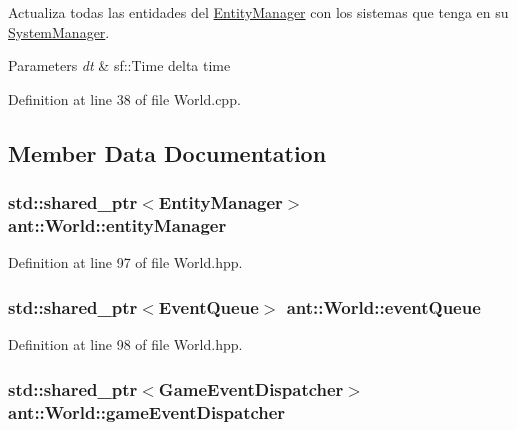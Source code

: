 Actualiza todas las entidades del \hyperlink{classant_1_1_entity_manager}{Entity\+Manager} con los sistemas que tenga en su \hyperlink{classant_1_1_system_manager}{System\+Manager}. 


\begin{DoxyParams}{Parameters}
{\em dt} & sf\+::\+Time delta time \\
\hline
\end{DoxyParams}


Definition at line 38 of file World.\+cpp.



\subsection{Member Data Documentation}
\hypertarget{classant_1_1_world_adc67b8557d684ffb1e029854d795e69d}{
\subsubsection[{entity\+Manager}]{\setlength{\rightskip}{0pt plus 5cm}std\+::shared\+\_\+ptr$<${\bf Entity\+Manager}$>$ ant\+::\+World\+::entity\+Manager\hspace{0.3cm}{\ttfamily [private]}}}\label{classant_1_1_world_adc67b8557d684ffb1e029854d795e69d}


Definition at line 97 of file World.\+hpp.

\hypertarget{classant_1_1_world_ab9634a4cf143a86701367438a989d277}{
\subsubsection[{event\+Queue}]{\setlength{\rightskip}{0pt plus 5cm}std\+::shared\+\_\+ptr$<${\bf Event\+Queue}$>$ ant\+::\+World\+::event\+Queue\hspace{0.3cm}{\ttfamily [private]}}}\label{classant_1_1_world_ab9634a4cf143a86701367438a989d277}


Definition at line 98 of file World.\+hpp.

\hypertarget{classant_1_1_world_a42d369d875c024b8e1342bcae2464032}{
\subsubsection[{game\+Event\+Dispatcher}]{\setlength{\rightskip}{0pt plus 5cm}std\+::shared\+\_\+ptr$<${\bf Game\+Event\+Dispatcher}$>$ ant\+::\+World\+::game\+Event\+Dispatcher\hspace{0.3cm}{\ttfamily [private]}}}\label{classant_1_1_world_a42d369d875c024b8e1342bcae2464032}


